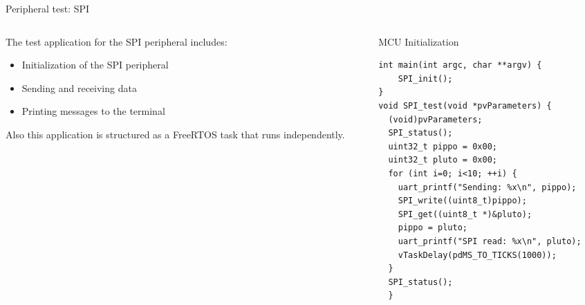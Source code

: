 \documentclass{beamer}
\begin{document}
\footlinecolor{}
\begin{frame}[fragile]{Peripheral test: SPI}
    \begin{columns}
        \begin{column}{0.5\textwidth}
            The test application for the SPI peripheral includes:
            \begin{itemize}
                \item Initialization of the SPI peripheral
                \item Sending and receiving data
                \item Printing messages to the terminal
            \end{itemize}
            Also this application is structured as a FreeRTOS task that runs independently.
        \end{column}
        \begin{column}{0.5\textwidth}
            \begin{block}{MCU Initialization}
                    \begin{footnotesize}
                        \begin{verbatim}
int main(int argc, char **argv) {
    SPI_init();
}
void SPI_test(void *pvParameters) {
  (void)pvParameters;
  SPI_status();
  uint32_t pippo = 0x00;
  uint32_t pluto = 0x00;
  for (int i=0; i<10; ++i) {
    uart_printf("Sending: %x\n", pippo);
    SPI_write((uint8_t)pippo);
    SPI_get((uint8_t *)&pluto);
    pippo = pluto;
    uart_printf("SPI read: %x\n", pluto);
    vTaskDelay(pdMS_TO_TICKS(1000));
  }
  SPI_status();
  }
                        \end{verbatim}
                    \end{footnotesize}
            \end{block}
        \end{column}
    \end{columns}
\end{frame}
\end{document}
